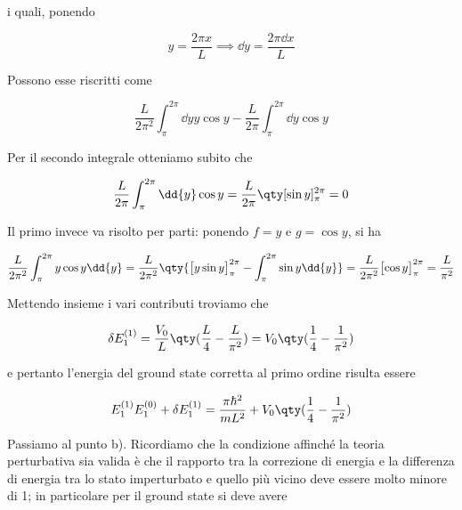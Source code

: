 \begin{soluzione}
   i quali, ponendo

   \begin{equation*}
      y=\frac{2\pi x}{L}
      \implies
      \dd{y}=\frac{2\pi \dd{x}}{L}
   \end{equation*}

   Possono esse riscritti come

   \begin{equation*}
      \frac{L}{2\pi^2} \int_{\pi}^{2\pi} \dd{y} y \cos{y} - \frac{L}{2\pi} \int_{\pi}^{2\pi} \dd{y} \cos{y}
   \end{equation*}

   Per il secondo integrale otteniamo subito che
   
   \begin{equation*}
      \frac{L}{2\pi} \int_{\pi}^{2\pi} \dd{y} \cos{y}
      =\frac{L}{2\pi} \qty[ \sin{y} ]_{\pi}^{2\pi}
      =0
   \end{equation*}

   Il primo invece va risolto per parti: ponendo $f=y$ e $g=\cos{y}$, si ha

   \begin{equation*}
      \frac{L}{2\pi^2} \int_{\pi}^{2\pi} y \cos{y} \dd{y}
      =\frac{L}{2\pi^2} \qty{ \bigl[ y \sin{y} \bigr]_{\pi}^{2\pi} - \int_{\pi}^{2\pi} \sin{y} \dd{y} }
      =\frac{L}{2\pi^2} \bigl[ \cos{y} \bigr]_{\pi}^{2\pi}
      =\frac{L}{\pi^2}
   \end{equation*}

   Mettendo insieme i vari contributi troviamo che

   \begin{equation*}
      \delta E_1^{(1)}
      =\frac{V_0}{L} \qty( \frac{L}{4} - \frac{L}{\pi^2} )
      =V_0\qty( \frac{1}{4} - \frac{1}{\pi^2} )
   \end{equation*}

   e pertanto l'energia del ground state corretta al primo ordine risulta essere

   \begin{equation*}
      E_1^{(1)}
      E_1^{(0)} + \delta E_1^{(1)}
      =\frac{\pi \hbar^2}{m L^2} + V_0\qty( \frac{1}{4} - \frac{1}{\pi^2} )
   \end{equation*}

   Passiamo al punto b). Ricordiamo che la condizione affinché la teoria perturbativa sia valida è che il rapporto tra la correzione di energia e la differenza di energia tra lo stato imperturbato e quello più vicino deve essere molto minore di 1; in particolare per il ground state si deve avere
   

\end{soluzione}

